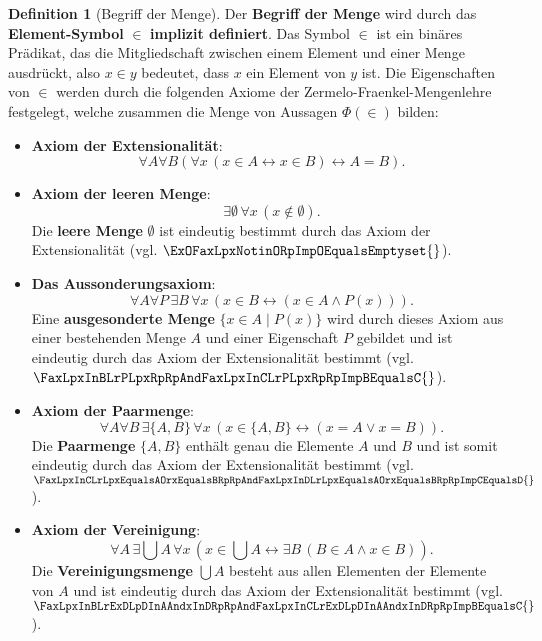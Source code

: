 \documentclass{book}
\theoremstyle{plain}
\theoremstyle{remark}
\theoremstyle{definition}
\newtheorem{definition}{Definition}[section]
\begin{document}
\begin{definition}[Begriff der Menge]
    Der \textbf{Begriff der Menge} wird durch das \textbf{Element-Symbol} \(\in\) \textbf{implizit definiert}. Das Symbol \(\in\) ist ein binäres Prädikat, das die Mitgliedschaft zwischen einem Element und einer Menge ausdrückt, also \(x \in y\) bedeutet, dass \(x\) ein Element von \(y\) ist. Die Eigenschaften von \(\in\) werden durch die folgenden Axiome der Zermelo-Fraenkel-Mengenlehre festgelegt, welche zusammen die Menge von Aussagen \(\Phi(\in)\) bilden:

    \begin{itemize}
        \item \textbf{Axiom der Extensionalität}: 
        \[
        \forall A \forall B \left( \forall x \, (x \in A \leftrightarrow x \in B) \leftrightarrow A = B \right).
        \]
        \item \textbf{Axiom der leeren Menge}:
        \[
        \exists \emptyset \, \forall x \, (x \notin \emptyset).
        \]
        Die \textbf{leere Menge} \(\emptyset\) ist eindeutig bestimmt durch das Axiom der Extensionalität (vgl. \(\ExOFaxLpxNotinORpImpOEqualsEmptyset{}\)).
        
        \item \textbf{Das Aussonderungsaxiom}:
        \[
        \forall A \forall P \, \exists B \, \forall x \, \left( x \in B \leftrightarrow (x \in A \land P(x)) \right).
        \]
        Eine \textbf{ausgesonderte Menge} \(\{ x \in A \mid P(x) \}\) wird durch dieses Axiom aus einer bestehenden Menge \(A\) und einer Eigenschaft \(P\) gebildet und ist eindeutig durch das Axiom der Extensionalität bestimmt (vgl. \(\FaxLpxInBLrPLpxRpRpAndFaxLpxInCLrPLpxRpRpImpBEqualsC{}\)).
        
        \item \textbf{Axiom der Paarmenge}: 
        \[
        \forall A \forall B \, \exists \{A, B\} \, \forall x \, \left( x \in \{A, B\} \leftrightarrow (x = A \lor x = B) \right).
        \]
        Die \textbf{Paarmenge} \(\{A, B\}\) enthält genau die Elemente \(A\) und \(B\) und ist somit eindeutig durch das Axiom der Extensionalität bestimmt (vgl. \(\FaxLpxInCLrLpxEqualsAOrxEqualsBRpRpAndFaxLpxInDLrLpxEqualsAOrxEqualsBRpRpImpCEqualsD{} \)).
        
        \item \textbf{Axiom der Vereinigung}:
        \[
        \forall A \, \exists \bigcup A \, \forall x \, \left( x \in \bigcup A \leftrightarrow \exists B \, (B \in A \land x \in B) \right).
        \]
        Die \textbf{Vereinigungsmenge} \(\bigcup A\) besteht aus allen Elementen der Elemente von \(A\) und ist eindeutig durch das Axiom der Extensionalität bestimmt (vgl. \(\FaxLpxInBLrExDLpDInAAndxInDRpRpAndFaxLpxInCLrExDLpDInAAndxInDRpRpImpBEqualsC{}\)).
        

\end{itemize}
\end{definition}
\end{document}
